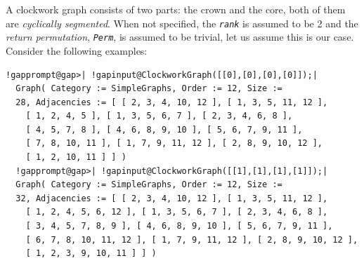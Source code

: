 \documentclass[a4paper,11pt]{report}
\begin{document}
{{{A clockwork graph consists of two parts: the crown and the core, both of them
are \emph{cyclically segmented}. When not specified, the \mbox{\texttt{\mdseries\slshape rank}} is assumed to be 2 and the \emph{return permutation}, \mbox{\texttt{\mdseries\slshape Perm}}, is assumed to be trivial, let us assume this is our case. Consider the
following examples: 

 
\begin{Verbatim}[commandchars=!@|,fontsize=\small,frame=single,label=Example]
  !gapprompt@gap>| !gapinput@ClockworkGraph([[0],[0],[0],[0]]);|
  Graph( Category := SimpleGraphs, Order := 12, Size := 
  28, Adjacencies := [ [ 2, 3, 4, 10, 12 ], [ 1, 3, 5, 11, 12 ], 
    [ 1, 2, 4, 5 ], [ 1, 3, 5, 6, 7 ], [ 2, 3, 4, 6, 8 ], 
    [ 4, 5, 7, 8 ], [ 4, 6, 8, 9, 10 ], [ 5, 6, 7, 9, 11 ], 
    [ 7, 8, 10, 11 ], [ 1, 7, 9, 11, 12 ], [ 2, 8, 9, 10, 12 ], 
    [ 1, 2, 10, 11 ] ] )
  !gapprompt@gap>| !gapinput@ClockworkGraph([[1],[1],[1],[1]]);|
  Graph( Category := SimpleGraphs, Order := 12, Size := 
  32, Adjacencies := [ [ 2, 3, 4, 10, 12 ], [ 1, 3, 5, 11, 12 ], 
    [ 1, 2, 4, 5, 6, 12 ], [ 1, 3, 5, 6, 7 ], [ 2, 3, 4, 6, 8 ], 
    [ 3, 4, 5, 7, 8, 9 ], [ 4, 6, 8, 9, 10 ], [ 5, 6, 7, 9, 11 ], 
    [ 6, 7, 8, 10, 11, 12 ], [ 1, 7, 9, 11, 12 ], [ 2, 8, 9, 10, 12 ], 
    [ 1, 2, 3, 9, 10, 11 ] ] )
\end{Verbatim}
 

}}}
\end{document}
